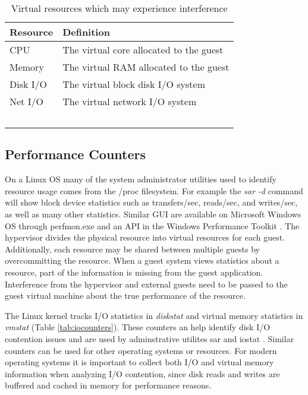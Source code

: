 \begin{table}
  \begin{tabular}{ l p{10cm} }
    Resource & Definition \\
    \hline
    CPU & The virtual core allocated to the guest \\
    Memory & The virtual RAM allocated to the guest \\
    Disk I/O & The virtual block disk I/O system \\
    Net I/O & The virtual network I/O system \\
    \hline
  \end{tabular}
\caption{Virtual resources which may experience interference}
\label{tab:resources}
\end{table}

\subsection{Performance Counters}
On a Linux OS many of the system administrator utilities used to identify resource usage comes from the /proc filesystem. 
For example the \emph{sar -d} command will show block device statistics such as transfers/sec, reads/sec, and writes/sec, as well as many other statistics.  
Similar GUI are available on Microsoft Windows OS through perfmon.exe and an API in the Windows Performance Toolkit \cite{winperf}. 
The hypervisor divides the physical resource into virtual resources for each guest.  
Additionally, each resource may be shared between multiple guests by overcommitting the resource.  
When a guest system views statistics about a resource, part of the information is missing from the guest application.  
Interference from the hypervisor and external guests need to be passed to the guest virtual machine about the true performance of the resource. 

\indent The Linux kernel tracks I/O statistics in \emph{diskstat} and virtual memory statistics in \emph{vmstat} (Table \ref{tab:iocounters}).  
These counters an help identify disk I/O contention issues and are used by adminstrative utilites sar and iostat \cite{iostats}.  
Similar counters can be used for other operating systems or resources. 
For modern operating systems it is important to collect both I/O and virtual memory information when analyzing I/O contention, since disk reads and writes are buffered and cached in memory for performance reasons. 

